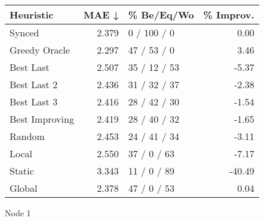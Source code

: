 \begin{tabular}{lrlr}
\toprule
\textbf{Heuristic} & \textbf{MAE ↓} & \textbf{\% Be/Eq/Wo} & \textbf{\% Improv.} \\
\midrule
            Synced &          2.379 &          0 / 100 / 0 &                0.00 \\
     Greedy Oracle &          2.297 &          47 / 53 / 0 &                3.46 \\
         Best Last &          2.507 &         35 / 12 / 53 &               -5.37 \\
       Best Last 2 &          2.436 &         31 / 32 / 37 &               -2.38 \\
       Best Last 3 &          2.416 &         28 / 42 / 30 &               -1.54 \\
    Best Improving &          2.419 &         28 / 40 / 32 &               -1.65 \\
            Random &          2.453 &         24 / 41 / 34 &               -3.11 \\
             Local &          2.550 &          37 / 0 / 63 &               -7.17 \\
            Static &          3.343 &          11 / 0 / 89 &              -40.49 \\
            Global &          2.378 &          47 / 0 / 53 &                0.04 \\
\bottomrule
\end{tabular}
\caption{Node 1}
\label{tab:hr_non_lr05_le2_bs2_1}
